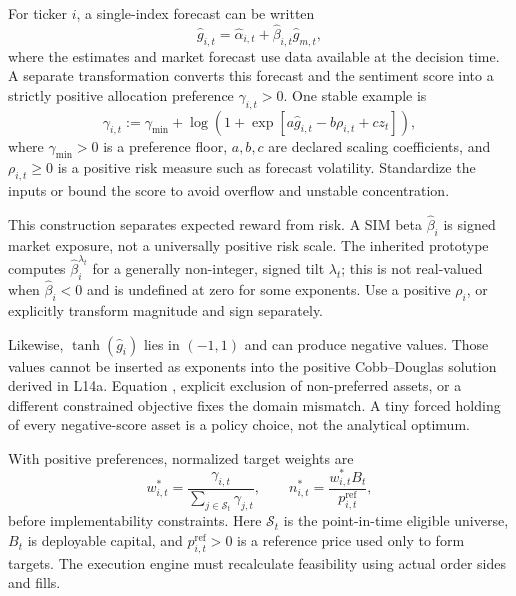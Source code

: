 \documentclass[11pt]{article}
\begin{document}
For ticker $i$, a single-index forecast can be written
\begin{equation}
  \label{eq:sim-forecast}
  \widehat g_{i,t}=\widehat\alpha_{i,t}
  +\widehat\beta_{i,t}\widehat g_{m,t},
\end{equation}
where the estimates and market forecast use data available at the decision time. A separate transformation converts this forecast and the sentiment score into a strictly positive allocation preference $\gamma_{i,t}>0$. One stable example is
\begin{equation}
  \label{eq:positive-preference}
  \gamma_{i,t}:=\gamma_{\min}+
  \log\!\left(1+\exp\!\left[
    a\widehat g_{i,t}-b\rho_{i,t}+cz_t
  \right]\right),
\end{equation}
where $\gamma_{\min}>0$ is a preference floor, $a,b,c$ are declared scaling coefficients, and $\rho_{i,t}\geq0$ is a positive risk measure such as forecast volatility. Standardize the inputs or bound the score to avoid overflow and unstable concentration.

This construction separates expected reward from risk. A SIM beta $\widehat\beta_i$ is signed market exposure, not a universally positive risk scale. The inherited prototype computes $\widehat\beta_i^{\lambda_t}$ for a generally non-integer, signed tilt $\lambda_t$; this is not real-valued when $\widehat\beta_i<0$ and is undefined at zero for some exponents. Use a positive $\rho_i$, or explicitly transform magnitude and sign separately.

Likewise, $\tanh(\widehat g_i)$ lies in $(-1,1)$ and can produce negative values. Those values cannot be inserted as exponents into the positive Cobb--Douglas solution derived in L14a. Equation , explicit exclusion of non-preferred assets, or a different constrained objective fixes the domain mismatch. A tiny forced holding of every negative-score asset is a policy choice, not the analytical optimum.

With positive preferences, normalized target weights are
\begin{equation}
  \label{eq:target-weights}
  w_{i,t}^*=\frac{\gamma_{i,t}}{\sum_{j\in\mathcal S_t}\gamma_{j,t}},
  \qquad
  n_{i,t}^*=\frac{w_{i,t}^*B_t}{p_{i,t}^{\mathrm{ref}}},
\end{equation}
before implementability constraints. Here $\mathcal S_t$ is the point-in-time eligible universe, $B_t$ is deployable capital, and $p_{i,t}^{\mathrm{ref}}>0$ is a reference price used only to form targets. The execution engine must recalculate feasibility using actual order sides and fills.
\end{document}
